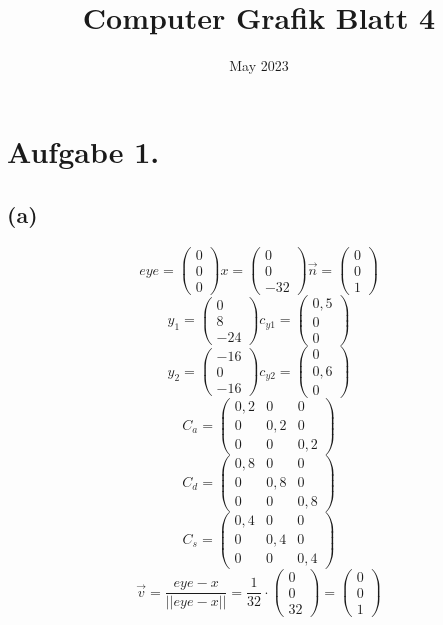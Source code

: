 \documentclass{article}
\title{Computer Grafik Blatt 4}
\date{May 2023}
\begin{document}
\maketitle

\section*{Aufgabe 1.}

\subsection*{(a)}
\[
eye = 
\begin{pmatrix}
0\\0\\0
\end{pmatrix}
x = 
\begin{pmatrix}
0\\0\\-32
\end{pmatrix}  
\overrightarrow{n} = 
\begin{pmatrix}
0\\0\\1
\end{pmatrix}
\]
\[
y_1 = 
\begin{pmatrix}
0\\8\\-24
\end{pmatrix}
c_{y1}= 
\begin{pmatrix}
0,5 \\ 0 \\ 0 
\end{pmatrix}
\]
\[
y_2 = 
\begin{pmatrix}
-16\\0\\-16
\end{pmatrix}
c_{y2}= 
\begin{pmatrix}
0 \\ 0,6 \\ 0 
\end{pmatrix}
\]
\[
C_a =
\begin{pmatrix}
0,2 & 0 & 0\\
0 & 0,2 & 0\\
0 & 0 & 0,2
\end{pmatrix}
\]
\[
C_d =
\begin{pmatrix}
0,8 & 0 & 0\\
0 & 0,8 & 0\\
0 & 0 & 0,8
\end{pmatrix}
\]
\[
C_s =
\begin{pmatrix}
0,4 & 0 & 0\\
0 & 0,4 & 0\\
0 & 0 & 0,4
\end{pmatrix}
\]
\[
\overrightarrow{v} = \frac{eye-x}{||eye-x||}= \frac{1}{32}\cdot
\begin{pmatrix}
0\\0\\32
\end{pmatrix}=
\begin{pmatrix}
0\\0\\1 
\end{pmatrix}
\]
\end{document}
